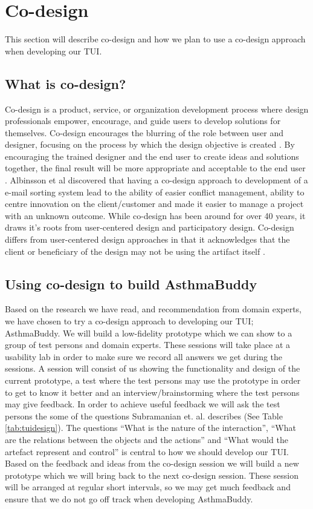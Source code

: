 \section{Co-design}
\label{sec:codesign}
This section will describe co-design and how we plan to use a co-design approach when developing our TUI.

\subsection{What is co-design?}
Co-design is a product, service, or organization development process where design professionals empower, encourage, and guide users to develop solutions for themselves. Co-design encourages the blurring of the role between user and designer, focusing on the process by which the design objective is created \cite{sanders2008co}. By encouraging the trained designer and the end user to create ideas and solutions together, the final result will be more appropriate and acceptable to the end user \cite{albinsson2007co}. 
Albinsson et al \cite{albinsson2007co} discovered that having a co-design approach to development of a e-mail sorting system lead to the ability of easier conflict management, ability to centre innovation on the client/customer and made it easier to manage a project with an unknown outcome. While co-design has been around for over 40 years, it draws it's roots from user-centered design and participatory design. Co-design differs from user-centered design approaches in that it acknowledges that the client or beneficiary of the design may not be using the artifact itself \cite{norman1986user}.



\subsection{Using co-design to build AsthmaBuddy}
Based on the research we have read, and recommendation from domain experts, we have chosen to try a co-design approach to developing our TUI; AsthmaBuddy. We will build a low-fidelity prototype which we can show to a group of test persons and domain experts. These sessions will take place at a usability lab in order to make sure we record all answers we get during the sessions. A session will consist of us showing the functionality and design of the current prototype, a test where the test persons may use the prototype in order to get to know it better and an interview/brainstorming where the test persons may give feedback. In order to achieve useful feedback we will ask the test persons the some of the questions Subramanian et. al. describes (See Table \ref{tab:tuidesign}). The questions ``What is the nature of the interaction'', ``What are the relations between the objects and the actions'' and ``What would the artefact represent and control'' is central to how we should develop our TUI.
Based on the feedback and ideas from the co-design session we will build a new prototype which we will bring back to the next co-design session. These session will be arranged at regular short intervals, so we may get much feedback and ensure that we do not go off track when developing AsthmaBuddy.
